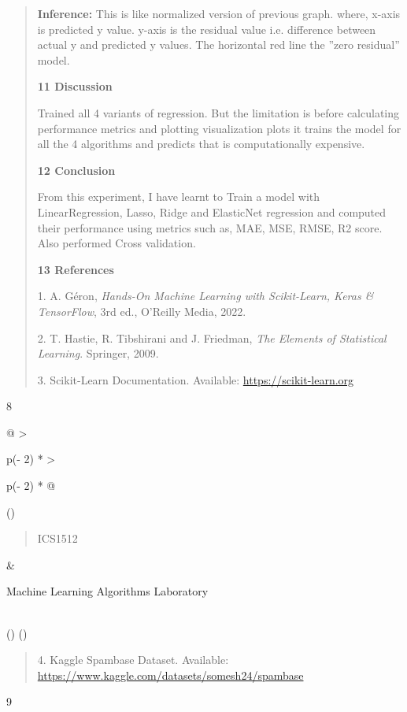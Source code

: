 \documentclass[
]{article}
\begin{document}
\begin{quote}
\textbf{Inference:} This is like normalized version of previous graph.
where, x-axis is predicted y value. y-axis is the residual value i.e.
difference between actual y and predicted y values. The horizontal red
line the ''zero residual'' model.

\textbf{11 Discussion}

Trained all 4 variants of regression. But the limitation is before
calculating performance metrics and plotting visualization plots it
trains the model for all the 4 algorithms and predicts that is
computationally expensive.

\textbf{12 Conclusion}

From this experiment, I have learnt to Train a model with
LinearRegression, Lasso, Ridge and ElasticNet regression and computed
their performance using metrics such as, MAE, MSE, RMSE, R2 score. Also
performed Cross validation.

\textbf{13 References}

1. A. Géron, \emph{Hands-On Machine Learning with Scikit-Learn, Keras \&
TensorFlow}, 3rd ed., O'Reilly Media, 2022.

2. T. Hastie, R. Tibshirani and J. Friedman, \emph{The Elements of
Statistical Learning}. Springer, 2009.

3. Scikit-Learn Documentation. Available:
\url{https://scikit-learn.org}
\end{quote}

8

\begin{longtable}[]{@{}
  >{\raggedright\arraybackslash}p{(\columnwidth - 2\tabcolsep) * }
  >{\raggedright\arraybackslash}p{(\columnwidth - 2\tabcolsep) * }@{}}
\toprule()
\begin{minipage}[b]{\linewidth}\raggedright
\begin{quote}
ICS1512
\end{quote}
\end{minipage} & \begin{minipage}[b]{\linewidth}\raggedright
Machine Learning Algorithms Laboratory
\end{minipage} \\
\midrule()
\endhead
\bottomrule()
\end{longtable}

\begin{quote}
4. Kaggle Spambase Dataset. Available:
\url{https://www.kaggle.com/datasets/somesh24/spambase}
\end{quote}

9
\end{document}
